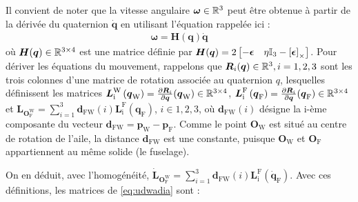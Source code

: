 Il convient de noter que la vitesse angulaire $\boldsymbol{\omega} \in {\mathbb R}^{3}$ peut être obtenue à partir de la dérivée du quaternion $\dot{\boldsymbol{q}}$ en utilisant l'équation \cite[équation (2.7)]{udwadia-schutte} rappelée ici : 
\begin{align*}
    \boldsymbol{\omega} = \boldsymbol{H}(\boldsymbol{q}) \dot{\boldsymbol{q}} 
\end{align*}
où $\boldsymbol{H}(\boldsymbol{q}) \in {\mathbb R}^{3\times4}$ est une matrice définie par $\boldsymbol{H}(\boldsymbol{q}) = 2\begin{bmatrix}-\boldsymbol{\epsilon} & \eta \mathbb{I}_{3} - \left[\boldsymbol{\epsilon}\right]_{\times}\end{bmatrix}$.
Pour dériver les équations du mouvement, rappelons que  $\boldsymbol{R}_{i}(\boldsymbol{q}) \in {\mathbb R}^{3}, i = 1,2,3$ sont les trois colonnes d'une matrice de rotation associée au quaternion $q$, lesquelles définissent les matrices $\boldsymbol{L}_{\text{i}}^{\text{W}} \left( \boldsymbol{q}_{\text{W}} \right) = \frac{\partial \boldsymbol{R}_{i}}{\partial \boldsymbol{q}}(\boldsymbol{q}_{\text{W}}) \in {\mathbb R}^{3\times4}$, 
$\boldsymbol{L}_{\text{i}}^{\text{F}} \left( \boldsymbol{q}_{\text{F}} \right) = \frac{\partial \boldsymbol{R}_{i}}{\partial \boldsymbol{q}}(\boldsymbol{q}_{\text{F}}) \in {\mathbb R}^{3\times4}$ et
$\boldsymbol{L}_{\boldsymbol{O}_{\text{F}}^{\text{W}}} = \sum_{i=1}^{3} \boldsymbol{d}_{\text{FW}}(i) \boldsymbol{L}_{\text{i}}^{\text{F}} (\boldsymbol{q}_{\text{F}})$, $i \in {1,2,3}$, où $\boldsymbol{d}_{\text{FW}}(i)$ désigne la i-ème composante du vecteur $\boldsymbol{d}_{\text{FW}} = \boldsymbol{p}_{\text{W}} - \boldsymbol{p}_{\text{F}}$. Comme le point $\boldsymbol{O}_{\text{W}}$ est situé au centre de rotation de l'aile, la distance $\boldsymbol{d}_{\text{FW}}$ est une constante, puisque $\boldsymbol{O}_{\text{W}}$ et $\boldsymbol{O}_{\text{F}}$ appartiennent au même solide (le fuselage).

On en déduit, avec l'homogénéité, $\dot{\boldsymbol{L}}_{\boldsymbol{O}_{\text{F}}^{\text{W}}} = \sum_{i=1}^{3} \boldsymbol{d}_{\text{FW}}(i) \boldsymbol{L}_{\text{i}}^{\text{F}} (\dot{\boldsymbol{q}}_{\text{F}})$. Avec ces définitions, les matrices de \eqref{eq:udwadia} sont :

